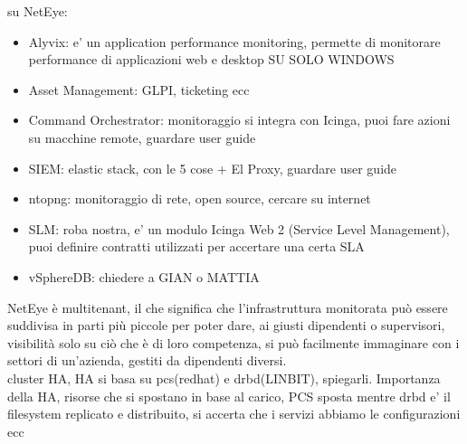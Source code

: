 su NetEye:
\begin{itemize}
  \item Alyvix: e' un application performance monitoring, permette di monitorare
    performance di applicazioni web e desktop SU SOLO WINDOWS

  \item Asset Management: GLPI, ticketing ecc

  \item Command Orchestrator: monitoraggio si integra con Icinga, puoi fare azioni
    su macchine remote, guardare user guide

  \item SIEM: elastic stack, con le 5 cose + El Proxy, guardare user guide

  \item ntopng: monitoraggio di rete, open source, cercare su internet

  \item SLM: roba nostra, e' un modulo Icinga Web 2 (Service Level Management), puoi
    definire contratti utilizzati per accertare una certa SLA

  \item vSphereDB: chiedere a GIAN o MATTIA
\end{itemize}
NetEye è multitenant, il che significa che l'infrastruttura monitorata può
essere suddivisa in parti più piccole per poter dare, ai giusti dipendenti o supervisori,
visibilità solo su ciò che è di loro competenza, si può facilmente immaginare con
i settori di un'azienda, gestiti da dipendenti diversi.\\ cluster HA, HA si basa
su pcs(redhat) e drbd(LINBIT), spiegarli. Importanza della HA, risorse che si
spostano in base al carico, PCS sposta mentre drbd e' il filesystem replicato e
distribuito, si accerta che i servizi abbiamo le configurazioni ecc